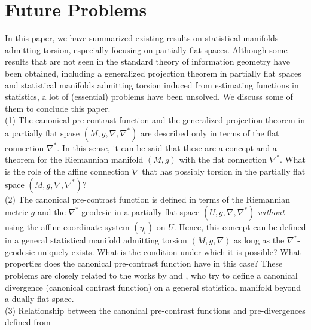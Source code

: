 \documentclass[graybox]{svmult}
\begin{document}
\section{Future Problems}
\label{sec:6}
In this paper, we have summarized existing results on statistical manifolds admitting
torsion, especially focusing on partially flat spaces. Although some results that are not
seen in the standard theory of information geometry have been obtained, including a
generalized projection theorem in partially flat spaces and statistical manifolds admitting
torsion induced from estimating functions in statistics, a lot of (essential) problems have
been unsolved. We discuss some of them to conclude this paper.
\vspace{3mm} \\
%
(1) The canonical pre-contrast function and the generalized projection theorem in a partially
    flat spase $(M,g,\nabla,\nabla^{\ast})$ are described only in terms of the flat connection
    $\nabla^{\ast}$. In this sense, it can be said that these are a concept and a theorem for
    the Riemannian manifold $(M,g)$ with the flat connection $\nabla^{\ast}$. What is the role
    of the affine connection $\nabla$ that has possibly torsion in the partially flat space
    $(M,g,\nabla,\nabla^{\ast})$? \vspace{2mm} \\
%
(2) The canonical pre-contrast function is defined in terms of the Riemannian metric $g$ and
    the $\nabla^{\ast}$-geodesic in a partially flat space $(U,g,\nabla,\nabla^{\ast})$
    {\it without} using the affine coordinate system $(\eta_i)$ on $U$.
    Hence, this concept can be defined in a general statistical manifold admitting torsion
    $(M,g,\nabla)$ as long as the $\nabla^{\ast}$-geodesic uniquely exists.
    What is the condition under which it is possible? What properties does the canonical 
    pre-contrast function have in this case?
    These problems are closely related to the works by \cite{HK} and \cite{AA}, who try to
    define a canonical divergence (canonical contrast function) on a general statistical
    manifold beyond a dually flat space. \vspace{2mm} \\
%
(3) Relationship between the canonical pre-contrast functions and pre-divergences defined from
\end{document}
